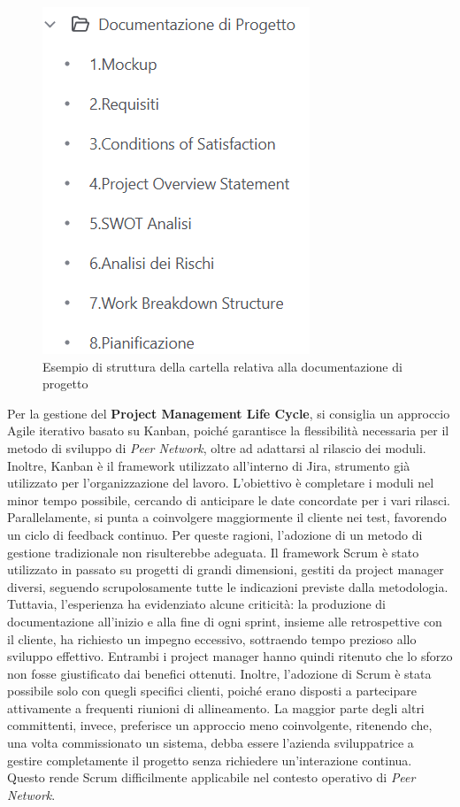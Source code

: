 \begin{figure}
    \centering
    \includegraphics[scale=0.6]{figures/strutturaConfluenceProposta.png}
    \caption{Esempio di struttura della cartella relativa alla documentazione di progetto}
    \label{fig:doc-progetto}
\end{figure}

Per la gestione del \textbf{Project Management Life Cycle}, si consiglia un approccio Agile \cite{project2017agile}
\cite{sliger2008software} \cite{Peters20241} \cite{beck2001agile} \cite{wysocki2011effective}
iterativo basato su Kanban, poiché garantisce
la flessibilità necessaria per il metodo di sviluppo di \textit{Peer Network}, oltre ad adattarsi al rilascio dei moduli.
Inoltre, Kanban è il framework utilizzato all’interno di Jira, strumento già utilizzato per l’organizzazione del lavoro. L’obiettivo è
completare i moduli nel minor tempo possibile, cercando di anticipare le date concordate per i vari rilasci. Parallelamente, si
punta a coinvolgere maggiormente il cliente nei test, favorendo un ciclo di feedback continuo. Per queste ragioni,
l’adozione di un metodo di gestione tradizionale non risulterebbe adeguata. Il framework Scrum è stato utilizzato in passato su progetti di
grandi dimensioni, gestiti da project manager diversi, seguendo scrupolosamente tutte le indicazioni previste dalla metodologia.
Tuttavia, l’esperienza ha evidenziato alcune criticità: la produzione di documentazione all’inizio e alla fine di ogni sprint,
insieme alle retrospettive con il cliente, ha richiesto un impegno eccessivo, sottraendo tempo prezioso allo sviluppo effettivo.
Entrambi i project manager hanno quindi ritenuto che lo sforzo non fosse giustificato dai benefici ottenuti. Inoltre, l’adozione
di Scrum è stata possibile solo con quegli specifici clienti, poiché erano disposti a partecipare attivamente a frequenti riunioni di
allineamento. La maggior parte degli altri committenti, invece, preferisce un approccio meno coinvolgente, ritenendo che, una volta
commissionato un sistema, debba essere l’azienda sviluppatrice a gestire completamente il progetto senza richiedere un’interazione
continua. Questo rende Scrum difficilmente applicabile nel contesto operativo di \textit{Peer Network}.

